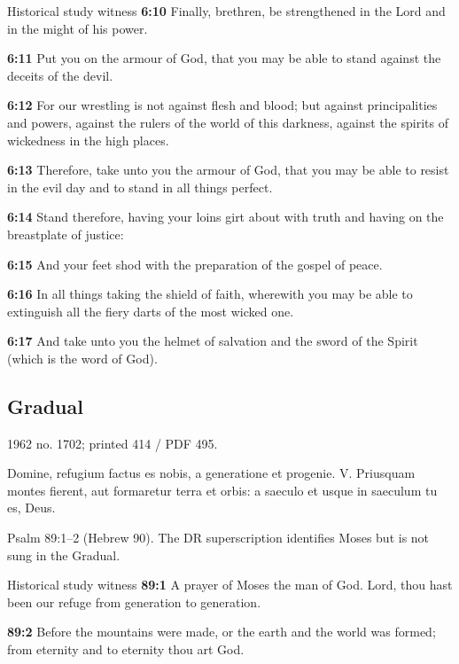 \begin{englishwitness}{Historical study witness}
\textbf{6:10} Finally, brethren, be strengthened in the Lord and in the might of his power.

\textbf{6:11} Put you on the armour of God, that you may be able to stand against the deceits of the devil.

\textbf{6:12} For our wrestling is not against flesh and blood; but against principalities and powers, against the rulers of the world of this darkness, against the spirits of wickedness in the high places.

\textbf{6:13} Therefore, take unto you the armour of God, that you may be able to resist in the evil day and to stand in all things perfect.

\textbf{6:14} Stand therefore, having your loins girt about with truth and having on the breastplate of justice:

\textbf{6:15} And your feet shod with the preparation of the gospel of peace.

\textbf{6:16} In all things taking the shield of faith, wherewith you may be able to extinguish all the fiery darts of the most wicked one.

\textbf{6:17} And take unto you the helmet of salvation and the sword of the Spirit (which is the word of God).
\end{englishwitness}

\subsection{Gradual}
\label{proper-gradual}

1962 no. 1702; printed 414 / PDF 495.

\begin{latinproper}
Domine, refugium factus es nobis, a generatione et progenie. V. Priusquam montes fierent, aut formaretur terra et orbis: a saeculo et usque in saeculum tu es, Deus.
\end{latinproper}

Psalm 89:1–2 (Hebrew 90). The DR superscription identifies Moses but is not sung in the Gradual.

\begin{englishwitness}{Historical study witness}
\textbf{89:1} A prayer of Moses the man of God. Lord, thou hast been our refuge from generation to generation.

\textbf{89:2} Before the mountains were made, or the earth and the world was formed; from eternity and to eternity thou art God.
\end{englishwitness}

